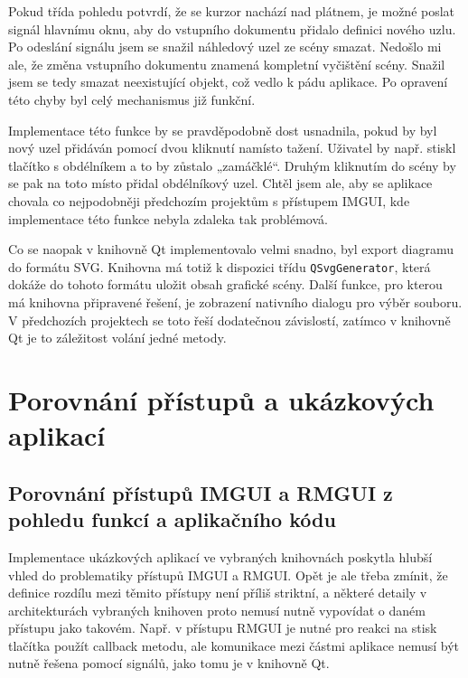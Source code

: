 \documentclass[FM,DP]{tulthesis}
\begin{document}
	Pokud třída pohledu potvrdí, že se kurzor nachází nad plátnem, je možné poslat signál hlavnímu oknu, aby do vstupního dokumentu přidalo definici nového uzlu. Po odeslání signálu jsem se snažil náhledový uzel ze scény smazat. Nedošlo mi ale, že změna vstupního dokumentu znamená kompletní vyčištění scény. Snažil jsem se tedy smazat neexistující objekt, což vedlo k pádu aplikace. Po opravení této chyby byl celý mechanismus již funkční.
	
	
	Implementace této funkce by se pravděpodobně dost usnadnila, pokud by byl nový uzel přidáván pomocí dvou kliknutí namísto tažení. Uživatel by např. stiskl tlačítko s obdélníkem a to by zůstalo „zamáčklé“. Druhým kliknutím do scény by se pak na toto místo přidal obdélníkový uzel. Chtěl jsem ale, aby se aplikace chovala co nejpodobněji předchozím projektům s přístupem IMGUI, kde implementace této funkce nebyla zdaleka tak problémová.

	Co se naopak v knihovně Qt implementovalo velmi snadno, byl export diagramu do formátu SVG. Knihovna má totiž k dispozici třídu \texttt{QSvgGenerator}, která dokáže do tohoto formátu uložit obsah grafické scény. Další funkce, pro kterou má knihovna připravené řešení, je zobrazení nativního dialogu pro výběr souboru. V předchozích projektech se toto řeší dodatečnou závislostí, zatímco v knihovně Qt je to záležitost volání jedné metody.
		
	\chapter{Porovnání přístupů a ukázkových aplikací}\label{CH5}
	
	\section{Porovnání přístupů IMGUI a RMGUI z pohledu funkcí a aplikačního kódu}
	
	Implementace ukázkových aplikací ve vybraných knihovnách poskytla hlubší vhled do problematiky přístupů IMGUI a RMGUI. Opět je ale třeba zmínit, že definice rozdílu mezi těmito přístupy není příliš striktní, a některé detaily v architekturách vybraných knihoven proto nemusí nutně vypovídat o daném přístupu jako takovém. Např. v přístupu RMGUI je nutné pro reakci na stisk tlačítka použít callback metodu, ale komunikace mezi částmi aplikace nemusí být nutně řešena pomocí signálů, jako tomu je v knihovně Qt.
	
\end{document}
